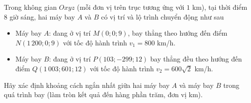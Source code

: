 \begin{ex}%
	Trong không gian $Oxyz$ (mỗi đơn vị trên trục tương ứng với $1$ km), tại thời điểm $8$ giờ sáng, hai máy bay $A$ và $B$ có vị trí và lộ trình chuyển động như sau
	\begin{itemize}
		\item Máy bay $A$: đang ở vị trí $M(0;0;9)$, bay thẳng theo hướng đến điểm $N(1\,200;0;9)$ với tốc độ hành trình $v_1=800$ km/h.
		\item Máy bay $B$: đang ở vị trí $P(103;-299;12)$ bay thẳng đều theo hướng đến điểm $Q(1\,003;601;12)$ với tốc độ hành trình $v_2=600\sqrt{2}$ km/h.
	\end{itemize}
	Hãy xác định khoảng cách ngắn nhất giữa hai máy bay $A$ và máy bay $B$ trong quá trình bay (làm tròn kết quả đến hàng phần trăm, đơn vị km).
\end{ex}
